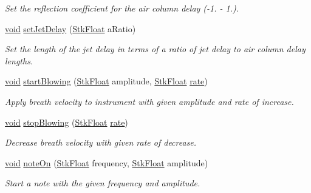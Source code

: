 \begin{DoxyCompactItemize}
\begin{DoxyCompactList}\small\item\em Set the reflection coefficient for the air column delay (-\/1. -\/ 1.). \end{DoxyCompactList}\item 
\hyperlink{sound_8c_ae35f5844602719cf66324f4de2a658b3}{void} \hyperlink{class_nyq_1_1_flute_a23e810c1c48f1fa63491092c91cc8ddd}{set\+Jet\+Delay} (\hyperlink{namespace_nyq_a044fa20a706520a617bbbf458a7db7e4}{Stk\+Float} a\+Ratio)
\begin{DoxyCompactList}\small\item\em Set the length of the jet delay in terms of a ratio of jet delay to air column delay lengths. \end{DoxyCompactList}\item 
\hyperlink{sound_8c_ae35f5844602719cf66324f4de2a658b3}{void} \hyperlink{class_nyq_1_1_flute_a7f09e3d895ff4ee2ff0764d7586c6906}{start\+Blowing} (\hyperlink{namespace_nyq_a044fa20a706520a617bbbf458a7db7e4}{Stk\+Float} amplitude, \hyperlink{namespace_nyq_a044fa20a706520a617bbbf458a7db7e4}{Stk\+Float} \hyperlink{seqread_8c_ad89d3fac2deab7a9cf6cfc8d15341b85}{rate})
\begin{DoxyCompactList}\small\item\em Apply breath velocity to instrument with given amplitude and rate of increase. \end{DoxyCompactList}\item 
\hyperlink{sound_8c_ae35f5844602719cf66324f4de2a658b3}{void} \hyperlink{class_nyq_1_1_flute_af058c9ef6500ef6c9f2a439a00c56835}{stop\+Blowing} (\hyperlink{namespace_nyq_a044fa20a706520a617bbbf458a7db7e4}{Stk\+Float} \hyperlink{seqread_8c_ad89d3fac2deab7a9cf6cfc8d15341b85}{rate})
\begin{DoxyCompactList}\small\item\em Decrease breath velocity with given rate of decrease. \end{DoxyCompactList}\item 
\hyperlink{sound_8c_ae35f5844602719cf66324f4de2a658b3}{void} \hyperlink{class_nyq_1_1_flute_a208753aa1aa3ebb7c946f70d0aaaa21a}{note\+On} (\hyperlink{namespace_nyq_a044fa20a706520a617bbbf458a7db7e4}{Stk\+Float} frequency, \hyperlink{namespace_nyq_a044fa20a706520a617bbbf458a7db7e4}{Stk\+Float} amplitude)
\begin{DoxyCompactList}\small\item\em Start a note with the given frequency and amplitude. \end{DoxyCompactList}\item 

\end{DoxyCompactItemize}
